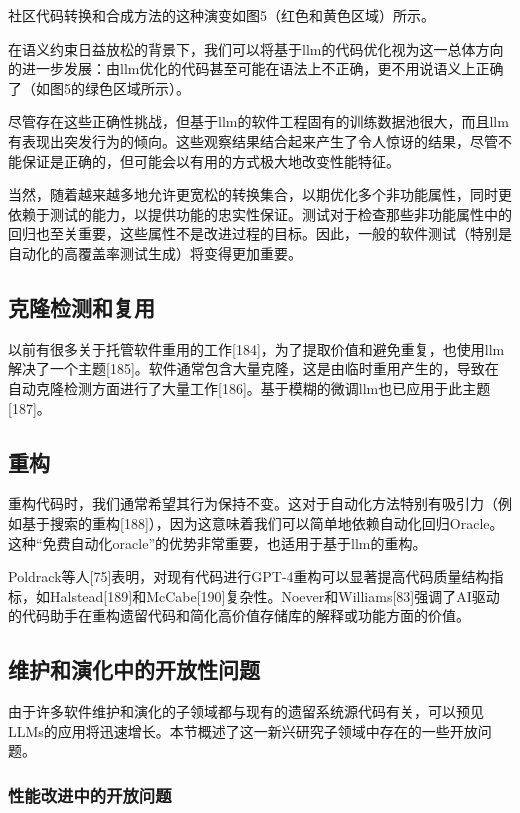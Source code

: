 \begin{translation}
社区代码转换和合成方法的这种演变如图5（红色和黄色区域）所示。

在语义约束日益放松的背景下，我们可以将基于llm的代码优化视为这一总体方向的进一步发展：由llm优化的代码甚至可能在语法上不正确，更不用说语义上正确了（如图5的绿色区域所示）。

尽管存在这些正确性挑战，但基于llm的软件工程固有的训练数据池很大，而且llm有表现出突发行为的倾向。这些观察结果结合起来产生了令人惊讶的结果，尽管不能保证是正确的，但可能会以有用的方式极大地改变性能特征。

当然，随着越来越多地允许更宽松的转换集合，以期优化多个非功能属性，同时更依赖于测试的能力，以提供功能的忠实性保证。测试对于检查那些非功能属性中的回归也至关重要，这些属性不是改进过程的目标。因此，一般的软件测试（特别是自动化的高覆盖率测试生成）将变得更加重要。

\subsection{克隆检测和复用}

以前有很多关于托管软件重用的工作[184]，为了提取价值和避免重复，也使用llm解决了一个主题[185]。软件通常包含大量克隆，这是由临时重用产生的，导致在自动克隆检测方面进行了大量工作[186]。基于模糊的微调llm也已应用于此主题[187]。

\subsection{重构}

重构代码时，我们通常希望其行为保持不变。这对于自动化方法特别有吸引力（例如基于搜索的重构[188]），因为这意味着我们可以简单地依赖自动化回归Oracle。这种“免费自动化oracle”的优势非常重要，也适用于基于llm的重构。

Poldrack等人[75]表明，对现有代码进行GPT-4重构可以显著提高代码质量结构指标，如Halstead[189]和McCabe[190]复杂性。Noever和Williams[83]强调了AI驱动的代码助手在重构遗留代码和简化高价值存储库的解释或功能方面的价值。

\subsection{维护和演化中的开放性问题}

由于许多软件维护和演化的子领域都与现有的遗留系统源代码有关，可以预见LLMs的应用将迅速增长。本节概述了这一新兴研究子领域中存在的一些开放问题。

\subsubsection{性能改进中的开放问题}


\end{translation}

